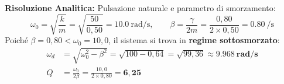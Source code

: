 \textbf{Risoluzione Analitica:}
Pulsazione naturale e parametro di smorzamento:
\begin{equation}
    \omega_0 = \sqrt{\frac{k}{m}} = \sqrt{\frac{50}{0{,}50}} = \SI{10.0}{\radian\per\second}, \qquad \beta = \frac{\gamma}{2m} = \frac{0{,}80}{2 \times 0{,}50} = \SI{0.80}{\per\second}
\end{equation}
Poiché $\beta = 0{,}80 < \omega_0 = 10{,}0$, il sistema si trova in \textbf{regime sottosmorzato}:
\begin{align}
    \omega_d &= \sqrt{\omega_0^2 - \beta^2} = \sqrt{100 - 0{,}64} = \sqrt{99{,}36} \approx \mathbf{\SI{9.968}{\radian\per\second}} \\
    Q &= \frac{\omega_0}{2\beta} = \frac{10{,}0}{2 \times 0{,}80} = \mathbf{6{,}25}
\end{align}
